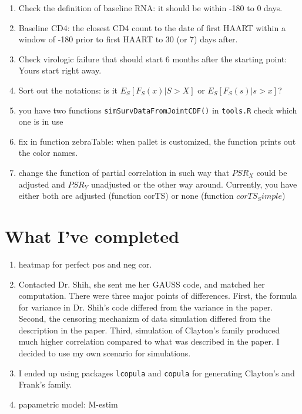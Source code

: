 \documentclass[]{article}
\begin{document}
\begin{enumerate}
  \item Check the definition of baseline RNA: it should be within -180 to 0 days.
  \item Baseline CD4: the  closest CD4 count to the date of first HAART within a window of -180 prior to first HAART to 30 (or 7) days after.
  \item Check virologic failure that should start 6 months after the starting point: Yours start right away.
  \item Sort out the notations: is it $E_S[F_S(x)|S>X]$ or $E_S[F_S(s)|s>x]$?
  \item you have two functions \texttt{simSurvDataFromJointCDF()} in \texttt{tools.R} check which one is in use
  \item fix in function zebraTable: when pallet is customized, the function prints out the color names.
  \item change the function of partial correlation in such way that $PSR_X$ could be adjusted and $PSR_Y$ unadjusted or the other way around. Currently, you have either both are adjusted (function corTS) or none (function $corTS_Simple$)
\end{enumerate}

\section{What I've completed}
\begin{enumerate}
  \item heatmap for perfect pos and neg cor.
  \item Contacted Dr. Shih, she sent me her GAUSS code, and matched her computation. There were three major points of differences. First, the formula for variance in Dr. Shih's code differed from the variance in the paper. Second, the censoring mechanizm of data simulation differed from the description in the paper. Third, simulation of Clayton's family produced much higher correlation compared to what was described in the paper. I decided to use my own scenario for simulations.
  \item I ended up using packages \texttt{lcopula} and \texttt{copula} for generating Clayton's and Frank's family.
  \item papametric model: M-estim 
\end{enumerate}


%
\end{document}
